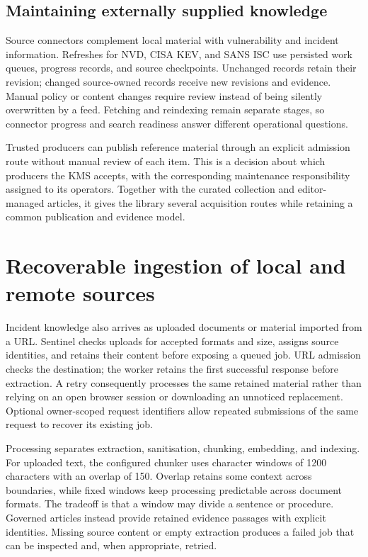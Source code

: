 \subsection{Maintaining externally supplied knowledge}

Source connectors complement local material with vulnerability and incident information. Refreshes for NVD, CISA KEV, and SANS ISC use persisted work queues, progress records, and source checkpoints. Unchanged records retain their revision; changed source-owned records receive new revisions and evidence. Manual policy or content changes require review instead of being silently overwritten by a feed. Fetching and reindexing remain separate stages, so connector progress and search readiness answer different operational questions.

Trusted producers can publish reference material through an explicit admission route without manual review of each item. This is a decision about which producers the KMS accepts, with the corresponding maintenance responsibility assigned to its operators. Together with the curated collection and editor-managed articles, it gives the library several acquisition routes while retaining a common publication and evidence model.

\section{Recoverable ingestion of local and remote sources}

Incident knowledge also arrives as uploaded documents or material imported from a URL. Sentinel checks uploads for accepted formats and size, assigns source identities, and retains their content before exposing a queued job. URL admission checks the destination; the worker retains the first successful response before extraction. A retry consequently processes the same retained material rather than relying on an open browser session or downloading an unnoticed replacement. Optional owner-scoped request identifiers allow repeated submissions of the same request to recover its existing job.

Processing separates extraction, sanitisation, chunking, embedding, and indexing. For uploaded text, the configured chunker uses character windows of 1200 characters with an overlap of 150. Overlap retains some context across boundaries, while fixed windows keep processing predictable across document formats. The tradeoff is that a window may divide a sentence or procedure. Governed articles instead provide retained evidence passages with explicit identities. Missing source content or empty extraction produces a failed job that can be inspected and, when appropriate, retried.

